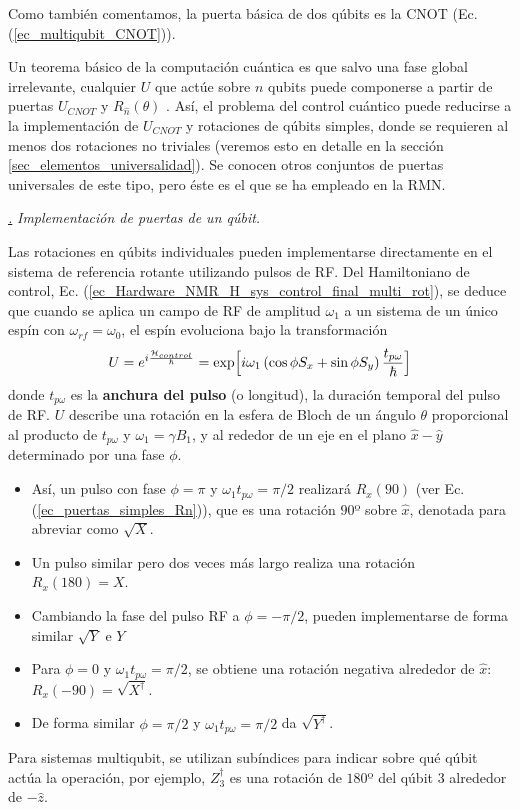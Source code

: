 \documentclass[a4paper,11pt]{book} %
\numberwithin{equation}{chapter}
\def\lp{\left(}
\def\rp{\right)}
\def\Lc{\Bigl[}
\def\Rc{\Bigr]}
\def\subsubiContadorIt{\par\addtocounter{subsubsection}{1}\underline{\it\thesubsubsection.}\hskip0.5cm \setcounter{subsubsubsectionIt}{0}}
\newcommand{\SubsubiIt}[1]{
		\subsubiContadorIt \textit{#1}
	}
\newcounter{subsubsubsectionIt}[subsubsection]
\begin{document}
Como también comentamos, la puerta básica de dos qúbits es la CNOT (Ec. (\ref{ec_multiqubit_CNOT})). 

Un teorema básico de la computación cuántica es que salvo una fase global irrelevante, cualquier $U$ que actúe sobre $n$ qubits puede componerse a partir de puertas $U_{CNOT}$ y $R_{\hat{n}}(\theta)$ \cite{bib_nielsen_chuang_2010} . Así, el problema del control cuántico puede reducirse a la implementación de $U_{CNOT}$ y rotaciones de qúbits simples, donde se requieren al menos dos rotaciones no triviales (veremos esto en detalle en la sección \ref{sec_elementos_universalidad}). Se conocen otros conjuntos de puertas universales de este tipo, pero éste es el que se ha empleado en la RMN.


			\SubsubiIt{Implementación de puertas de un qúbit.}

Las rotaciones en qúbits individuales pueden implementarse directamente en el sistema de referencia rotante utilizando pulsos de RF. Del Hamiltoniano de control, Ec. (\ref{ec_Hardware_NMR_H_sys_control_final_multi_rot}), se deduce que cuando se aplica un campo de RF de amplitud $\omega_1$ a un sistema de un único espín con $\omega_{rf} = \omega_0$, el espín evoluciona bajo la transformación
	\begin{equation} \label{ec_Hardware_NMR_U_arbitrario}
	U = e^{i \frac{\mathcal{H}_{control}}{\hbar}} = \exp \Lc i \omega_1 \lp  \cos \phi S_x + \sin \phi S_y \rp \frac{t_{p \omega}}{\hbar} \Rc
	\end{equation}
donde $t_{p \omega}$ es la \textbf{anchura del pulso} (o longitud), la duración temporal del pulso de RF. $U$ describe una rotación en la esfera de Bloch de un ángulo $\theta$ proporcional al producto de $t_{p\omega}$ y $\omega_1 = \gamma B_1$, y al rededor de un eje en el plano $\hat{x}-\hat{y}$ determinado por una fase $\phi$.

\begin{itemize}
	\item Así, un pulso con fase $\phi = \pi$ y $\omega_1 t_{p\omega} = \pi/2$ realizará $R_x(90)$ (ver Ec. (\ref{ec_puertas_simples_Rn})), que es una rotación $90$º sobre $\hat{x}$, denotada para abreviar como $\sqrt{X}$.
	\item Un pulso similar pero dos veces más largo realiza una rotación $R_x(180) =  X$.
	\item Cambiando la fase del pulso RF a $\phi = -\pi/2$, pueden implementarse de forma similar $\sqrt{Y}$ e $Y$
	\item Para $\phi = 0$ y $\omega_1 t_{p\omega} = \pi/2$, se obtiene una rotación negativa alrededor de $\hat{x}$: $R_x (-90) = \sqrt{X^\dagger}$.
	\item De forma similar $\phi = \pi/2$ y $\omega_1 t_{p\omega} = \pi/2$ da $\sqrt{Y^\dagger}$.
\end{itemize}
Para sistemas multiqubit, se utilizan subíndices para indicar sobre qué qúbit actúa la operación, por ejemplo, $Z^\dagger_3$ es una rotación de $180$º del qúbit 3 alrededor de $- \hat{z}$.
\end{document}
